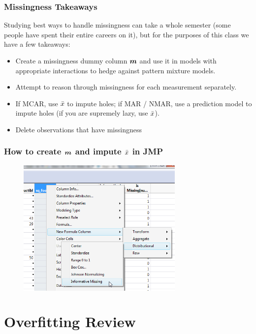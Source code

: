 \documentclass[handout]{beamer}
\begin{document}
\begin{frame}\frametitle{Missingness Takeaways}

Studying best ways to handle missingness can take a whole semester (some people have spent their entire careers on it), but for the purposes of this class we have a few takeaways: \pause

\begin{itemize}
\item Create a missingness dummy column $\boldsymbol{m}$ and use it in models with appropriate interactions to hedge against pattern mixture models. \pause
\item Attempt to reason through missingness for each measurement separately. \pause
\item If MCAR, use $\bar{x}$ to impute holes; if MAR / NMAR, use a prediction model to impute holes \pause (if you are supremely lazy, use $\bar{x}$).
\item Delete observations that have missingness 
\end{itemize}
	
\end{frame}

\begin{frame}\frametitle{How to create $\boldsymbol{m}$ and impute $\bar{x}$ in JMP}

\begin{figure}
\centering
\includegraphics[width=3.2in]{m_create_and_impute_via_xbar.png}
\end{figure}


\end{frame}

\section{Overfitting Review}
\end{document}
